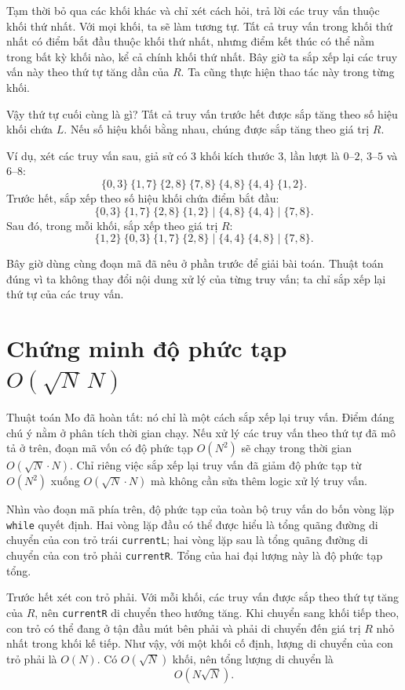 \documentclass[11pt]{article}
\begin{document}
Tạm thời bỏ qua các khối khác và chỉ xét cách hỏi, trả lời các truy vấn thuộc
khối thứ nhất. Với mọi khối, ta sẽ làm tương tự. Tất cả truy vấn trong khối thứ
nhất có điểm bắt đầu thuộc khối thứ nhất, nhưng điểm kết thúc có thể nằm trong
bất kỳ khối nào, kể cả chính khối thứ nhất. Bây giờ ta sắp xếp lại các truy vấn
này theo thứ tự tăng dần của $R$. Ta cũng thực hiện thao tác này trong từng
khối.

Vậy thứ tự cuối cùng là gì? Tất cả truy vấn trước hết được sắp tăng theo số
hiệu khối chứa $L$. Nếu số hiệu khối bằng nhau, chúng được sắp tăng theo giá
trị $R$.

Ví dụ, xét các truy vấn sau, giả sử có $3$ khối kích thước $3$, lần lượt là
$0$--$2$, $3$--$5$ và $6$--$8$:
\[
  \{0,3\}\ \{1,7\}\ \{2,8\}\ \{7,8\}\ \{4,8\}\ \{4,4\}\ \{1,2\}.
\]
Trước hết, sắp xếp theo số hiệu khối chứa điểm bắt đầu:
\[
  \{0,3\}\ \{1,7\}\ \{2,8\}\ \{1,2\}\mid
  \{4,8\}\ \{4,4\}\mid
  \{7,8\}.
\]
Sau đó, trong mỗi khối, sắp xếp theo giá trị $R$:
\[
  \{1,2\}\ \{0,3\}\ \{1,7\}\ \{2,8\}\mid
  \{4,4\}\ \{4,8\}\mid
  \{7,8\}.
\]

Bây giờ dùng cùng đoạn mã đã nêu ở phần trước để giải bài toán. Thuật toán đúng
vì ta không thay đổi nội dung xử lý của từng truy vấn; ta chỉ sắp xếp lại thứ
tự của các truy vấn.

\section{Chứng minh độ phức tạp \texorpdfstring{$O(\sqrt N\,N)$}{O(sqrt(N)N)}}

Thuật toán Mo đã hoàn tất: nó chỉ là một cách sắp xếp lại truy vấn. Điểm đáng
chú ý nằm ở phân tích thời gian chạy. Nếu xử lý các truy vấn theo thứ tự đã mô
tả ở trên, đoạn mã vốn có độ phức tạp $O(N^2)$ sẽ chạy trong thời gian
$O(\sqrt N\cdot N)$. Chỉ riêng việc sắp xếp lại truy vấn đã giảm độ phức tạp từ
$O(N^2)$ xuống $O(\sqrt N\cdot N)$ mà không cần sửa thêm logic xử lý truy vấn.

Nhìn vào đoạn mã phía trên, độ phức tạp của toàn bộ truy vấn do bốn vòng lặp
\texttt{while} quyết định. Hai vòng lặp đầu có thể được hiểu là tổng quãng
đường di chuyển của con trỏ trái \texttt{currentL}; hai vòng lặp sau là tổng
quãng đường di chuyển của con trỏ phải \texttt{currentR}. Tổng của hai đại
lượng này là độ phức tạp tổng.

Trước hết xét con trỏ phải. Với mỗi khối, các truy vấn được sắp theo thứ tự
tăng của $R$, nên \texttt{currentR} di chuyển theo hướng tăng. Khi chuyển sang
khối tiếp theo, con trỏ có thể đang ở tận đầu mút bên phải và phải di chuyển
đến giá trị $R$ nhỏ nhất trong khối kế tiếp. Như vậy, với một khối cố định,
lượng di chuyển của con trỏ phải là $O(N)$. Có $O(\sqrt N)$ khối, nên tổng
lượng di chuyển là
\[
  O(N\sqrt N).
\]
\end{document}
